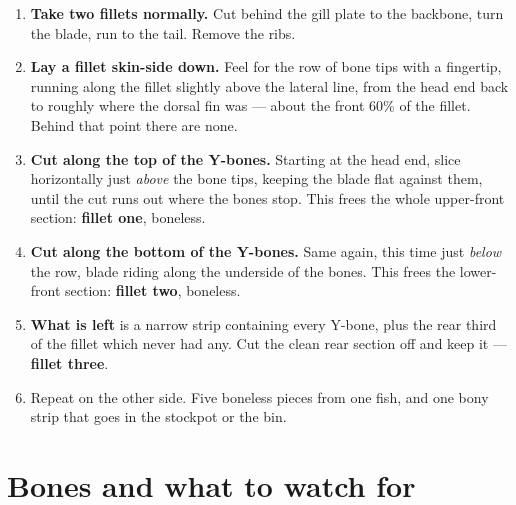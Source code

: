 \begin{enumerate}
\item \textbf{Take two fillets normally.} Cut behind the gill plate to the backbone, turn the blade, run to the tail. Remove the ribs.
\item \textbf{Lay a fillet skin-side down.} Feel for the row of bone tips with a fingertip, running along the fillet slightly above the lateral line, from the head end back to roughly where the dorsal fin was --- about the front 60\% of the fillet. Behind that point there are none.
\item \textbf{Cut along the top of the Y-bones.} Starting at the head end, slice horizontally just \emph{above} the bone tips, keeping the blade flat against them, until the cut runs out where the bones stop. This frees the whole upper-front section: \textbf{fillet one}, boneless.
\item \textbf{Cut along the bottom of the Y-bones.} Same again, this time just \emph{below} the row, blade riding along the underside of the bones. This frees the lower-front section: \textbf{fillet two}, boneless.
\item \textbf{What is left} is a narrow strip containing every Y-bone, plus the rear third of the fillet which never had any. Cut the clean rear section off and keep it --- \textbf{fillet three}.
\item Repeat on the other side. Five boneless pieces from one fish, and one bony strip that goes in the stockpot or the bin.
\end{enumerate}

\section{Bones and what to watch for}
\begin{telosfacts}[0.20]
\end{telosfacts}

